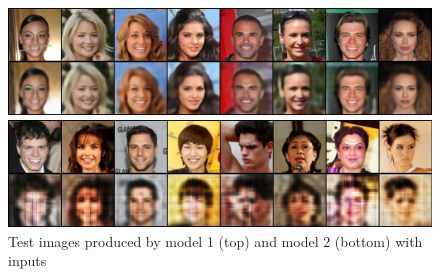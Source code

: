 \documentclass{article}
\begin{document}
\begin{figure}[t]
	\centering 
	\includegraphics[width=0.95\linewidth]{figures/imgs_model_1}
	
	\vspace{0.5cm}
	
	\includegraphics[width=0.95\linewidth]{figures/imgs_model_2}
	\caption{Test images produced by model 1 (top) and model 2 (bottom) with inputs}
	\label{fig:images}
\end{figure}
\end{document}
